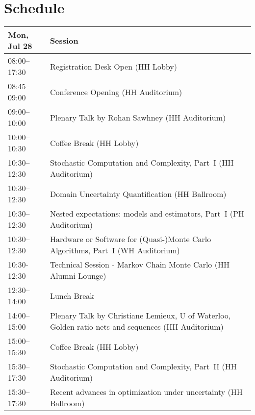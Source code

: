 \chapter{Schedule}
\begin{table}
{\footnotesize
\begin{tabularx}{\textwidth}{>{\hsize=0.32\hsize}X|>{\hsize=1.7\hsize}X}
\hline
\textbf{Mon, Jul 28} & \textbf{Session} \\
\hline
\cellcolor{\EmptyColor}08:00–17:30 & \cellcolor{\EmptyColor}Registration Desk Open (HH Lobby) \\
\cellcolor{\PlenaryColor}08:45–09:00 & \cellcolor{\PlenaryColor}Conference Opening (HH Auditorium) \\
\cellcolor{\PlenaryColor}09:00–10:00 & \cellcolor{\PlenaryColor}Plenary Talk by Rohan Sawhney (HH Auditorium) \\
\cellcolor{\EmptyColor}10:00–10:30 & \cellcolor{\EmptyColor}Coffee Break (HH Lobby) \\
\cellcolor{\SessionTitleColor}10:30–12:30 & \cellcolor{\SessionTitleColor}Stochastic Computation and Complexity, Part~I (HH Auditorium) \\
\cellcolor{\SessionTitleColor}10:30–12:30 & \cellcolor{\SessionTitleColor}Domain Uncertainty Quantification (HH Ballroom) \\
\cellcolor{\SessionTitleColor}10:30–12:30 & \cellcolor{\SessionTitleColor}Nested expectations: models and estimators, Part~I (PH Auditorium) \\
\cellcolor{\SessionTitleColor}10:30–12:30 & \cellcolor{\SessionTitleColor}Hardware or Software for (Quasi-)Monte Carlo Algorithms, Part~I (WH Auditorium) \\
\cellcolor{\SessionLightColor}10:30-12:30 & \cellcolor{\SessionLightColor}Technical Session - Markov Chain Monte Carlo (HH Alumni Lounge) \\
\cellcolor{\EmptyColor}12:30–14:00 & \cellcolor{\EmptyColor}Lunch Break \\
\cellcolor{\PlenaryColor}14:00–15:00 & \cellcolor{\PlenaryColor}Plenary Talk by Christiane Lemieux, U of Waterloo, Golden ratio nets and sequences (HH Auditorium) \\
\cellcolor{\EmptyColor}15:00–15:30 & \cellcolor{\EmptyColor}Coffee Break (HH Lobby) \\
\cellcolor{\SessionTitleColor}15:30–17:30 & \cellcolor{\SessionTitleColor}Stochastic Computation and Complexity, Part~II (HH Auditorium) \\
\cellcolor{\SessionTitleColor}15:30–17:30 & \cellcolor{\SessionTitleColor}Recent advances in optimization under uncertainty (HH Ballroom) \\

\end{tabularx}}
\end{table}
